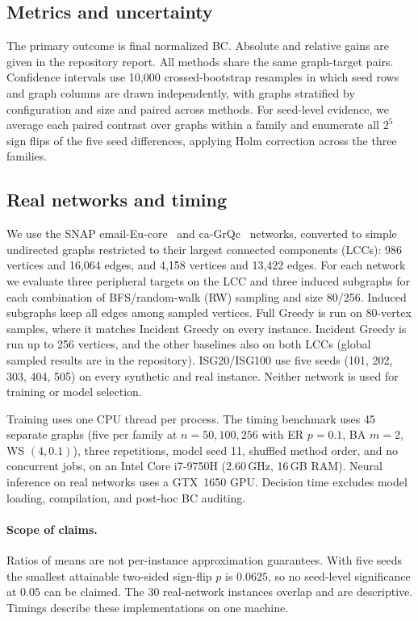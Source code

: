 \documentclass[runningheads]{llncs}
\begin{document}
\subsection{Metrics and uncertainty}
The primary outcome is final normalized BC. Absolute and relative gains are
given in the repository report. All methods share the same graph-target pairs.
Confidence intervals use 10,000 crossed-bootstrap resamples in which seed
rows and graph columns are drawn independently, with graphs stratified by
configuration and size and paired across methods. For seed-level evidence,
we average each paired contrast over graphs within a family and enumerate
all $2^5$ sign flips of the five seed differences, applying Holm correction
across the three families.

\subsection{Real networks and timing}
We use the SNAP email-Eu-core~\cite{Yin2017} and ca-GrQc~\cite{Leskovec2007}
networks, converted to simple undirected graphs restricted to their largest
connected components (LCCs): 986 vertices and 16,064 edges, and 4,158
vertices and 13,422 edges. For each network we evaluate three peripheral
targets on the LCC and three induced subgraphs for each combination of
BFS/random-walk (RW) sampling and size 80/256. Induced subgraphs keep all
edges among sampled vertices. Full Greedy is run on 80-vertex samples, where it
matches Incident Greedy on every instance. Incident Greedy is run up to 256
vertices, and the other baselines also on both LCCs (global sampled results
are in the repository).
ISG20/ISG100 use five seeds (101, 202, 303, 404, 505) on every synthetic and real
instance. Neither network is used for training or model selection.

Training uses one CPU thread per process. The timing benchmark uses 45
separate graphs (five per family at $n=50,100,256$ with ER $p=0.1$, BA $m=2$,
WS $(4,0.1)$), three repetitions, model seed 11, shuffled method order, and no
concurrent jobs, on an Intel Core i7-9750H (2.60\,GHz, 16\,GB RAM). Neural
inference on real networks uses a GTX~1650 GPU. Decision time excludes
model loading, compilation, and post-hoc BC auditing.

\paragraph{Scope of claims.} Ratios of means are not per-instance
approximation guarantees. With five seeds the smallest attainable
two-sided sign-flip $p$ is $0.0625$, so no seed-level significance at
$0.05$ can be claimed. The 30 real-network instances overlap and are
descriptive. Timings describe these implementations on one machine.
\end{document}
